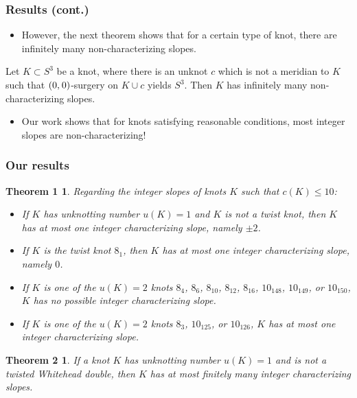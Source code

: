 \documentclass{beamer}
\newcommand{\hs}{\hspace{0.05em}} %
\newtheorem{theorem1}[theorem]{Theorem 1}
\newtheorem{theorem2}[theorem]{Theorem 2}
\theoremstyle{ex}
\theoremstyle{rem}
\begin{document}
	\begin{frame}
		\frametitle{Results (cont.)}
		\begin{itemize}
		\item However, the next theorem shows that for a certain type of knot, there are infinitely many non-characterizing slopes.
		\end{itemize}
		\pause
		\begin{theorem}
			Let $K\subset S^3$ be a knot, where there is an unknot $c$ which is not a meridian to $K$ such that $(0,\hs0)$-surgery on $K\cup c$ yields $S^3$. Then $K$ has infinitely many non-characterizing slopes.
		\end{theorem}
		\pause
		\begin{itemize}
		\item Our work shows that for knots satisfying reasonable conditions, most integer slopes are non-characterizing!
		\end{itemize}
	\end{frame}
	
	\begin{frame}
		\frametitle{Our results}
		\begin{theorem1}
			Regarding the integer slopes of knots $K$ such that $c(K) \leq 10$:
			\begin{itemize}
				\item If $K$ has unknotting number $u(K) = 1$ and $K$ is not a twist knot, then $K$ has at most \textit{one} integer characterizing slope, namely $\pm 2$.
				\item If $K$ is the twist knot $8_1$, then $K$ has at most \textit{one} integer characterizing slope, namely $0$.
				\item If $K$ is one of the $u(K) = 2$ knots $8_4$, $8_6$, $8_{10}$, $8_{12}$, $8_{16}$, $10_{148}$, $10_{149}$, or $10_{150}$, $K$ has no possible integer characterizing slope.
				\item If $K$ is one of the $u(K) = 2$ knots $8_3$, $10_{125}$, or $10_{126}$, $K$ has at most \textit{one} integer characterizing slope.
			\end{itemize}
		\end{theorem1}
		\pause
		\begin{theorem2}
			If a knot $K$ has unknotting number $u(K)=1$ and is not a twisted Whitehead double, then $K$ has at most finitely many integer characterizing slopes.
		\end{theorem2}
	\end{frame}
	
\end{document}
